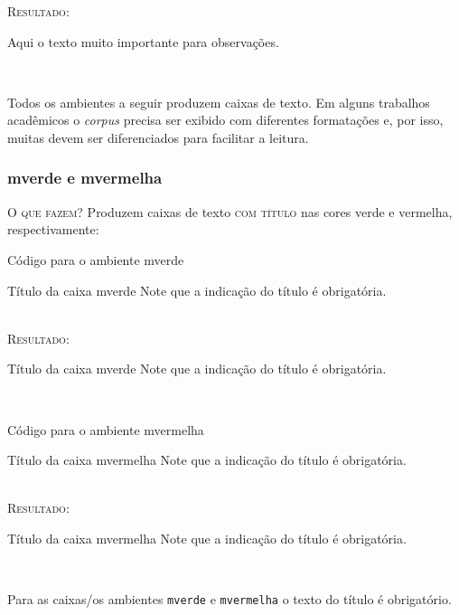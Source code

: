 \textsc{Resultado:}
\ \\

\begin{observ}
	Aqui o texto muito importante para observações.
\end{observ}
\ \\

Todos os ambientes a seguir produzem caixas de texto. Em alguns trabalhos acadêmicos o \textit{corpus} precisa ser exibido com diferentes formatações e, por isso, muitas devem ser diferenciados para facilitar a leitura. 

\subsubsection{mverde e mvermelha}

\textsc{O que fazem?} Produzem caixas de texto \textsc{com título} nas cores verde e vermelha, respectivamente:
\ \\

\begin{codex}{Código para o ambiente mverde}
	\begin{mverde}{Título da caixa mverde}
	Note que a indicação do título é obrigatória.
	\end{mverde}
\end{codex}
\ \\

\textsc{Resultado:}
\begin{mverde}{Título da caixa mverde}
	Note que a indicação do título é obrigatória.
\end{mverde}
\ \\

\begin{codex}{Código para o ambiente mvermelha}
	\begin{mvermelha}{Título da caixa mvermelha}
	Note que a indicação do título é obrigatória.
	\end{mvermelha}
\end{codex}
\ \\

\textsc{Resultado:}
\begin{mvermelha}{Título da caixa mvermelha}
	Note que a indicação do título é obrigatória.
\end{mvermelha}
\ \\

\noindent{} 

Para as caixas/os ambientes \verb|mverde| e \verb|mvermelha| o texto do título é obrigatório.

